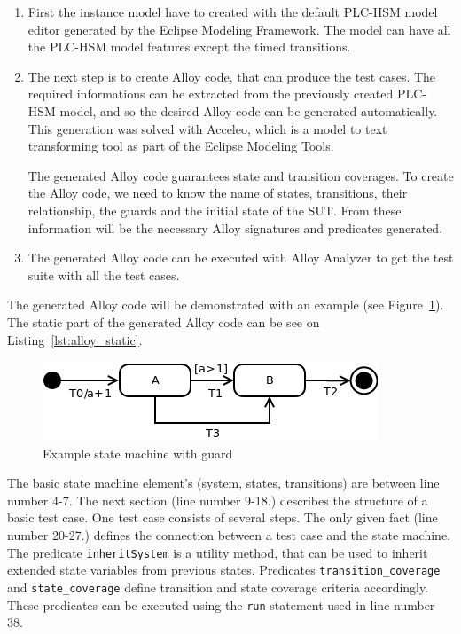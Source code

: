 \begin{enumerate}
	\item First the instance model have to created with the default PLC-HSM model editor generated by the Eclipse Modeling Framework. The model can have all the PLC-HSM model features except the timed transitions.
	\item The next step is to create Alloy code, that can produce the test cases. The required informations can be extracted from the previously created PLC-HSM model, and so the desired Alloy code can be generated automatically. This generation was solved with Acceleo, which is a model to text transforming tool as part of the Eclipse Modeling Tools.
	
	The generated Alloy code guarantees state and transition coverages. To create the Alloy code, we need to know the name of states, transitions, their relationship, the guards and the initial state of the SUT. From these information will be the necessary Alloy signatures and predicates generated.
	\item The generated Alloy code can be executed with Alloy Analyzer to get the test suite with all the test cases.
\end{enumerate}

The generated Alloy code will be demonstrated with an example (see Figure~\ref{fig:alloy_statemachine}). The static part of the generated Alloy code can be see on Listing~\ref{lst:alloy_static}.

\begin{figure}[htp]
\centering
\includegraphics[scale=0.5]{figures/alloy_statemachine}
\caption{Example state machine with guard}
\label{fig:alloy_statemachine}
\end{figure}

The basic state machine element's (system, states, transitions) are between line number 4-7. The next section (line number 9-18.) describes the structure of a basic test case. One test case consists of several steps. The only given fact (line number 20-27.) defines the connection between a test case and the state machine. The predicate \texttt{inheritSystem} is a utility method, that can be used to inherit extended state variables from previous states. Predicates \texttt{transition\_coverage} and \texttt{state\_coverage} define transition and state coverage criteria accordingly. These predicates can be executed using the \texttt{run} statement used in line number 38.

